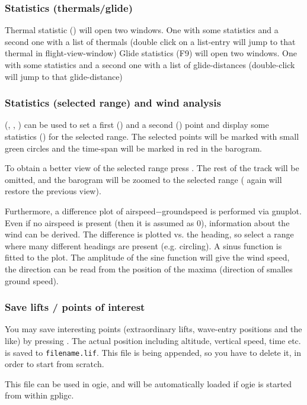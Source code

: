 \subsubsection{Statistics (thermals/glide)}
Thermal statistic () will open two windows. One with some statistics and a
second one with a list of thermals (double click on a list-entry will jump
to that thermal in flight-view-window)
Glide statistics (F9) will open two windows. One with some statistics and a
second one with a list of glide-distances (double-click will jump to that
glide-distance)

\subsubsection{Statistics (selected range) and wind analysis}
(, , ) can be used to set a first () and a second () point and
display some statistics () for the selected range. The selected points will be
marked with small green circles and the time-span will be marked in red in the barogram.

To obtain a better view of the selected range press . The rest of the track will be omitted, and the
barogram will be zoomed to the selected range ( again will restore the previous view).

Furthermore, a difference plot of airspeed$-$groundspeed is performed via gnuplot. Even if no airspeed is present
(then it is assumed as 0), information about the wind can be derived. The difference is plotted vs. the heading,
so select a range where many different headings are present (e.g. circling). A sinus function is fitted to the plot.
The amplitude of the sine function will give the wind speed, the direction can be read from the position of the maxima (direction of smalles ground speed).



\subsubsection{Save lifts / points of interest}
You may save interesting points (extraordinary lifts, wave-entry positions and the like) by pressing .
The actual position including altitude, vertical speed, time etc. is saved to \texttt{filename.lif}.
This file is being appended, so you have to delete it, in order to start from scratch.

This file can be used in ogie, and will be automatically loaded if ogie is started from within gpligc.


